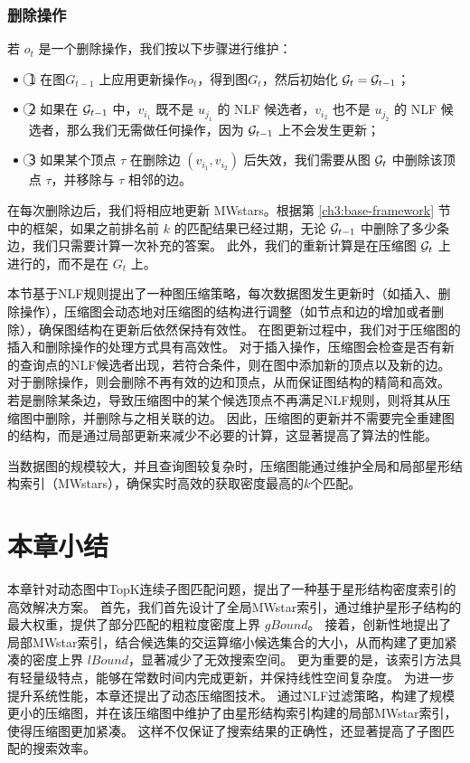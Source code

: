 \subsubsection{删除操作}
若 $o_t$ 是一个删除操作，我们按以下步骤进行维护：
\begin{itemize}
\item \textcircled{1} 在图$G_{t-1}$ 上应用更新操作$o_t$，得到图$G_t$，然后初始化 $\mathcal{G}_t = \mathcal{G}_{t-1}$；
\item \textcircled{2} 如果在 $\mathcal{G}_{t-1}$ 中，$v_{i_1}$ 既不是 $u_{j_1}$ 的 NLF 候选者，$v_{i_2}$ 也不是 $u_{j_2}$ 的 NLF 候选者，那么我们无需做任何操作，因为 $\mathcal{G}_{t-1}$ 上不会发生更新；
\item \textcircled{3} 如果某个顶点 $\tau$ 在删除边 $(v_{i_1}, v_{i_2})$ 后失效，我们需要从图 $\mathcal{G}_t$ 中删除该顶点 $\tau$，并移除与 $\tau$ 相邻的边。
\end{itemize}

在每次删除边后，我们将相应地更新 MWstars。根据第 \ref{ch3:base-framework} 节中的框架，如果之前排名前 $k$ 的匹配结果已经过期，无论 $\mathcal{G}_{t-1}$ 中删除了多少条边，我们只需要计算一次补充的答案。
此外，我们的重新计算是在压缩图 $\mathcal{G}_t$ 上进行的，而不是在 $G_t$ 上。


本节基于NLF规则提出了一种图压缩策略，每次数据图发生更新时（如插入、删除操作），压缩图会动态地对压缩图的结构进行调整（如节点和边的增加或者删除），确保图结构在更新后依然保持有效性。
在图更新过程中，我们对于压缩图的插入和删除操作的处理方式具有高效性。
对于插入操作，压缩图会检查是否有新的查询点的NLF候选者出现，若符合条件，则在图中添加新的顶点以及新的边。
对于删除操作，则会删除不再有效的边和顶点，从而保证图结构的精简和高效。
若是删除某条边，导致压缩图中的某个候选顶点不再满足NLF规则，则将其从压缩图中删除，并删除与之相关联的边。
因此，压缩图的更新并不需要完全重建图的结构，而是通过局部更新来减少不必要的计算，这显著提高了算法的性能。

当数据图的规模较大，并且查询图较复杂时，压缩图能通过维护全局和局部星形结构索引（MWstars），确保实时高效的获取密度最高的$k$个匹配。

\section{本章小结}
本章针对动态图中TopK连续子图匹配问题，提出了一种基于星形结构密度索引的高效解决方案。
首先，我们首先设计了全局MWstar索引，通过维护星形子结构的最大权重，提供了部分匹配的粗粒度密度上界 $gBound$。
接着，创新性地提出了局部MWstar索引，结合候选集的交运算缩小候选集合的大小，从而构建了更加紧凑的密度上界 $lBound$，显著减少了无效搜索空间。
更为重要的是，该索引方法具有轻量级特点，能够在常数时间内完成更新，并保持线性空间复杂度。
为进一步提升系统性能，本章还提出了动态压缩图技术。
通过NLF过滤策略，构建了规模更小的压缩图，并在该压缩图中维护了由星形结构索引构建的局部MWstar索引，使得压缩图更加紧凑。
这样不仅保证了搜索结果的正确性，还显著提高了子图匹配的搜索效率。

